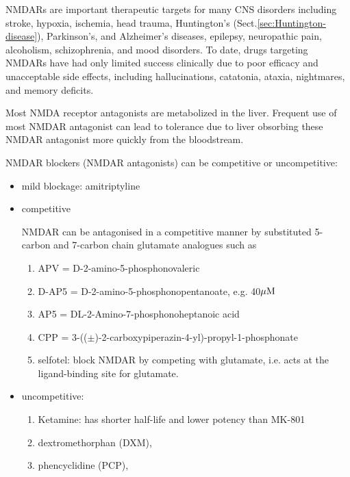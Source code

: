 NMDARs are important therapeutic targets for many CNS disorders including
stroke, hypoxia, ischemia, head trauma, Huntington's
(Sect.\ref{sec:Huntington-disease}), Parkinson's, and Alzheimer's diseases,
epilepsy, neuropathic pain, alcoholism, schizophrenia, and mood disorders. To
date, drugs targeting NMDARs have had only limited success clinically due to
poor efficacy and unacceptable side effects, including hallucinations,
catatonia, ataxia, nightmares, and memory deficits.

Most NMDA receptor antagonists are metabolized in the liver.
Frequent use of most NMDAR antagonist can lead to tolerance due to liver
obsorbing these NMDAR antagonist more quickly from the bloodstream.

NMDAR blockers (NMDAR antagonists) can be competitive or uncompetitive:
\begin{itemize}
  
  \item mild blockage: amitriptyline 
  
  \item competitive

NMDAR can be antagonised in a competitive manner by substituted 5-carbon and
7-carbon chain glutamate analogues such as
\begin{enumerate}
  \item APV = D-2-amino-5-phosphonovaleric
  
  \item D-AP5 = D-2-amino-5-phosphonopentanoate, e.g. 40${\mu\text{M}}$

  \item AP5 = DL-2-Amino-7-phosphonoheptanoic acid 

  \item CPP = 3-(($\pm$)-2-carboxypiperazin-4-yl)-propyl-1-phosphonate
  
  \item selfotel:  block NMDAR by competing with glutamate, i.e. acts  at 
  the ligand-binding site for glutamate.
  
\end{enumerate}

  \item  uncompetitive: 
\begin{enumerate}
  \item Ketamine: has shorter half-life and lower potency than MK-801
  
  \item dextromethorphan (DXM), 
  
  \item phencyclidine (PCP), 
  

\end{enumerate}
\end{itemize}

